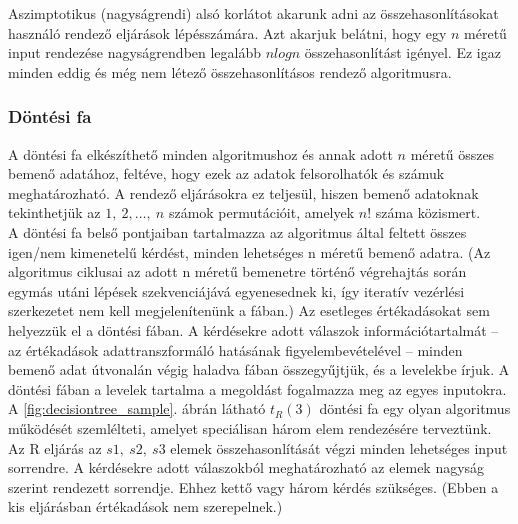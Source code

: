 \documentclass[12pt,margin=0px]{article}
\begin{document}
    \noindent Aszimptotikus (nagyságrendi) alsó korlátot akarunk adni az összehasonlításokat használó rendező eljárások lépésszámára. Azt akarjuk belátni, hogy egy $n$ méretű input rendezése nagyságrendben legalább $n log n$ összehasonlítást igényel. Ez igaz minden eddig és még nem létező összehasonlításos rendező algoritmusra.

    \subsubsection*{Döntési fa}

    \noindent A döntési fa elkészíthető minden algoritmushoz és annak adott $n$ méretű összes bemenő adatához, feltéve, hogy ezek az adatok felsorolhatók és számuk meghatározható. A rendező eljárásokra ez teljesül, hiszen bemenő adatoknak tekinthetjük az $1,\ 2, \ldots,\ n$ számok permutációit, amelyek $n!$ száma közismert.\\

    \noindent A döntési fa belső pontjaiban tartalmazza az algoritmus által feltett összes igen/nem kimenetelű kérdést, minden lehetséges n méretű bemenő adatra. (Az algoritmus ciklusai az adott n méretű bemenetre történő végrehajtás során egymás utáni lépések szekvenciájává egyenesednek ki, így iteratív vezérlési szerkezetet nem kell megjelenítenünk a fában.) Az esetleges értékadásokat sem helyezzük el a döntési fában. A kérdésekre adott válaszok információtartalmát – az értékadások adattranszformáló hatásának figyelembevételével – minden bemenő adat útvonalán végig haladva fában összegyűjtjük, és a levelekbe írjuk. A döntési fában a levelek tartalma a megoldást fogalmazza meg az egyes inputokra.\\

    \noindent A \ref{fig:decisiontree_sample}. ábrán látható $t_{R}(3)$ döntési fa egy olyan algoritmus működését szemlélteti, amelyet speciálisan három elem rendezésére terveztünk. Az R eljárás az $s1,\ s2,\ s3$ elemek összehasonlítását végzi minden lehetséges input sorrendre. A kérdésekre adott válaszokból meghatározható az elemek nagyság szerint rendezett sorrendje. Ehhez kettő vagy három kérdés szükséges. (Ebben a kis eljárásban értékadások nem szerepelnek.)
\end{document}
